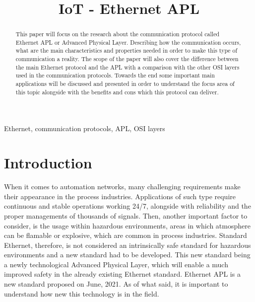 \documentclass[conference]{IEEEtran}
\begin{document}
\title{IoT - Ethernet APL\\
}

\author{

}

\maketitle

\begin{abstract}
This paper will focus on the research about the communication protocol called Ethernet APL or Advanced Physical Layer. Describing how the communication occurs, what are the main characteristics and properties needed in order to make this type of communication a reality. The scope of the paper will also cover the difference between the main Ethernet protocol and the APL with a comparison with the other OSI layers used in the communication protocols. Towards the end some important main applications will be discussed and presented in order to understand the focus area of this topic alongside with the benefits and cons which this protocol can deliver.
 
\end{abstract}

\begin{IEEEkeywords}
Ethernet, communication protocols, APL, OSI layers
\end{IEEEkeywords}

\section{Introduction}
When it comes to automation networks, many challenging requirements make their appearance in the process industries. Applications of such type require continuous and stable operations working 24/7, alongside with reliability and the proper managements of thousands of signals. Then, another important factor to consider, is the usage within hazardous environments, areas in which atmosphere can be flamable or explosive, which are common in process industries. Standard Ethernet, therefore, is not considered an intrinsically safe standard for hazardous environments and a new standard had to be developed. This new standard being a newly technological Advanced Physical Layer, which will enable a much improved safety in the already existing Ethernet standard. Ethernet APL is a new standard proposed on June, 2021. As of what said, it is important to understand how new this technology is in the field.
\end{document}
